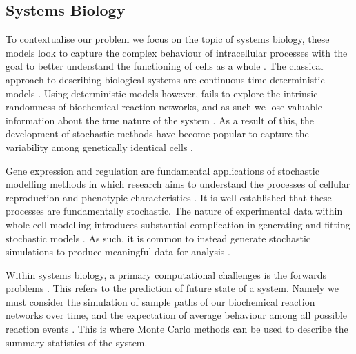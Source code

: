 \subsection{Systems Biology}
To contextualise our problem we focus on the topic of systems biology, these models look to capture the complex behaviour of intracellular processes with the goal to better understand the functioning of cells as a whole \cite{abkowitzEvidenceThatHematopoiesis1996, arkinStochasticKineticAnalysis1998, kaernStochasticityGeneExpression2005, wilkinsonStochasticModellingQuantitative2009}. The classical approach to describing biological systems are continuous-time deterministic models \cite{wilkinsonStochasticModellingQuantitative2009,highamModelingSimulatingChemical2008}. Using deterministic models however, fails to explore the intrinsic randomness of biochemical reaction networks, and as such we lose valuable information about the true nature of the system \cite{elowitzStochasticGeneExpression2002,rajNatureNurtureChance2008}. As a result of this, the development of stochastic methods have become popular to capture the variability among genetically identical cells \cite{rajNatureNurtureChance2008}. 

Gene expression and regulation are fundamental applications of stochastic modelling methods in which research aims to understand the processes of cellular reproduction and phenotypic characteristics \cite{kaernStochasticityGeneExpression2005,elowitzStochasticGeneExpression2002}. It is well established that these processes are fundamentally stochastic. The nature of experimental data within whole cell modelling introduces substantial complication in generating and fitting stochastic models \cite{wilkinsonStochasticModellingQuantitative2009}. As such, it is common to instead generate stochastic simulations to produce meaningful data for analysis \cite{sunnakerApproximateBayesianComputation2013,highamModelingSimulatingChemical2008}. 

Within systems biology, a primary computational challenges is the forwards problems \cite{warneSimulationInferenceAlgorithms2019}. This refers to the prediction of future state of a system. Namely we must consider the simulation of sample paths of our biochemical reaction networks over time, and the expectation of average behaviour among all possible reaction events \cite{warneSimulationInferenceAlgorithms2019}. This is where Monte Carlo methods can be used to describe the summary statistics of the system. 

